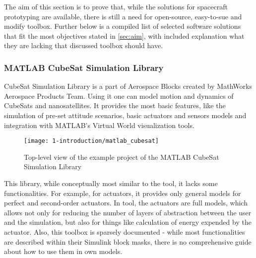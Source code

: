     The aim of this section is to prove that, while the solutions for spacecraft prototyping are available, there is still a need for open-source, easy-to-sue and modify toolbox. Further below is a compiled list of selected software solutions that fit the most objectives stated in \autoref{sec:aim}, with included explanation what they are lacking that discussed toolbox should have.
 

    \subsubsection{MATLAB CubeSat Simulation Library}
        CubeSat Simulation Library is a part of Aerospace Blocks created by MathWorks Aerospace Products Team. Using it one can model motion and dynamics of CubeSats and nanosatellites. It provides the most basic features, like the simulation of pre-set attitude scenarios, basic actuators and sensors models and integration with MATLAB's Virtual World visualization tools.
        
        \begin{figure}[H]
            \centering
            \texttt{[image: 1-introduction/matlab\_cubesat]}
            \caption{Top-level view of the example project of the MATLAB CubeSat Simulation Library}
            \label{fig:matlab_cubesat}
        \end{figure}

        This library, while conceptually most similar to the \ac{tool}, it lacks some functionalities. For example, for actuators, it provides only general models for perfect and second-order actuators. In \ac{tool}, the actuators are full models, which allows not only for reducing the number of layers of abstraction between the user and the simulation, but also for things like calculation of energy expended by the actuator. Also, this toolbox is sparsely documented - while most functionalities are described within their Simulink block masks, there is no comprehensive guide about how to use them in own models\cite{matlabcubesat}.


